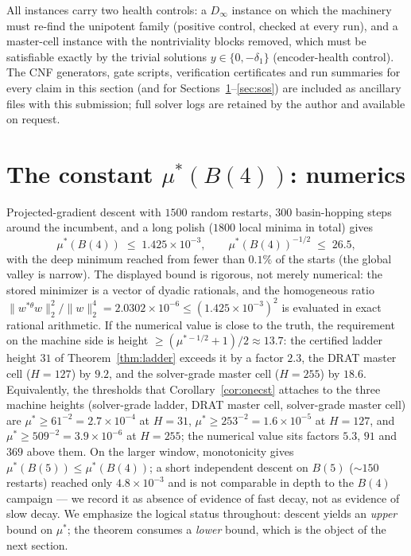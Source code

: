 \documentclass[10pt,a4paper]{amsart}
\newcommand{\thst}{{*\theta}}
\begin{document}
All instances carry two health controls: a $D_\infty$ instance on
which the machinery must re-find the unipotent family (positive
control, checked at every run), and a master-cell instance with the
nontriviality blocks removed, which must be satisfiable exactly by the
trivial solutions $y\in\{0,-\delta_1\}$ (encoder-health control).
The CNF generators, gate scripts, verification certificates and run
summaries for every claim in this section (and for
Sections~\ref{sec:mu}--\ref{sec:sos}) are included as ancillary files
with this submission; full solver logs are retained by the author and
available on request.

\section{The constant $\mu^*(B(4))$: numerics}\label{sec:mu}

Projected-gradient descent with $1500$ random restarts, $300$
basin-hopping steps around the incumbent, and a long polish ($1800$
local minima in total) gives
\[
\mu^*(B(4))\;\le\;1.425\times10^{-3},\qquad
\mu^*(B(4))^{-1/2}\;\le\;26.5,
\]
with the deep minimum reached from fewer than $0.1\%$ of the starts
(the global valley is narrow).  The displayed bound is rigorous, not
merely numerical: the stored minimizer is a vector of dyadic
rationals, and the homogeneous ratio
$\|w^{\thst}w\|_2^2/\|w\|_2^4=2.0302\times10^{-6}\le(1.425\times
10^{-3})^2$ is evaluated in exact rational arithmetic.  If the numerical value is close to the
truth, the requirement on the machine side is height
$\ge(\mu^{*-1/2}+1)/2\approx 13.7$: the certified ladder height $31$
of Theorem~\ref{thm:ladder} exceeds it by a factor $2.3$, the DRAT
master cell ($H=127$) by $9.2$, and the solver-grade master cell
($H=255$) by $18.6$.  Equivalently, the thresholds that
Corollary~\ref{cor:onecst} attaches to the three machine heights
(solver-grade ladder, DRAT master cell, solver-grade master cell) are
$\mu^*\ge 61^{-2}=2.7\times10^{-4}$ at $H=31$,
$\mu^*\ge 253^{-2}=1.6\times10^{-5}$ at $H=127$, and
$\mu^*\ge 509^{-2}=3.9\times10^{-6}$ at $H=255$; the numerical value
sits factors $5.3$, $91$ and $369$ above them.  On the larger window, monotonicity gives
$\mu^*(B(5))\le\mu^*(B(4))$; a short independent descent on $B(5)$
($\sim150$ restarts) reached only $4.8\times10^{-3}$ and is not
comparable in depth to the $B(4)$ campaign --- we record it as absence
of evidence of fast decay, not as evidence of slow decay.  We
emphasize the logical status throughout: descent yields an
\emph{upper} bound on $\mu^*$; the theorem consumes a \emph{lower}
bound, which is the object of the next section.
\end{document}
